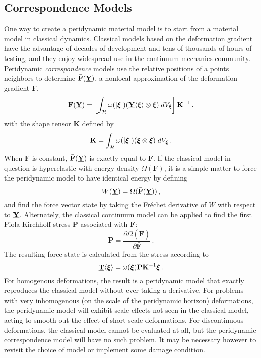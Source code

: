 \subsection{Correspondence Models}
One way to create a peridynamic material model is to start from a material model in classical dynamics.
Classical models based on the deformation gradient have the advantage of decades of development and tens of thousands of hours of testing, and they enjoy widespread use in the continuum mechanics community.
Peridynamic \textit{correspondence} models use the relative positions of a points neighbors to determine $\bar{\mathbf{F}}(\vstate{Y}{}{})$, a nonlocal approximation of the deformation gradient $\mathbf{F}$.
%
\begin{equation}
\label{eq:PDapproxGradient}
\bar{\mathbf{F}}(\vstate{Y}{}{}) = \left[\int_\mathcal{H} \omega(|\boldsymbol{\xi}|)(\vstate{Y}{}{\boldsymbol{\xi}}\otimes \boldsymbol{\xi})\;dV_{\boldsymbol{\xi}} \right]\mathbf{K}^{-1}\, ,
\end{equation}
with the shape tensor $\mathbf{K}$ defined by
\begin{equation}
\mathbf{K} = \int_\mathcal{H}\omega(|\boldsymbol{\xi}|)(\boldsymbol{\xi} \otimes \boldsymbol{\xi})\;dV_{\boldsymbol{\xi}}\, . \notag
\end{equation}
%
When $\mathbf{F}$ is constant, $\bar{\mathbf{F}}(\vstate{Y}{}{})$ is exactly equal to $\mathbf{F}$.
If the classical model in question is hyperelastic with energy density $\Omega(\mathbf{F})$, it is a simple matter to force the peridynamic model to have identical energy by defining
\begin{equation}
W(\vstate{Y}{}{}) = \Omega(\bar{\mathbf{F}}(\vstate{Y}{}{}))\, ,
\end{equation}
and find the force vector state by taking the Fr\'echet derivative of $W$ with respect to $\vstate{Y}{}{}$.
Alternately, the classical continuum model can be applied to find the first Piola-Kirchhoff stress $\mathbf{P}$ associated with $\bar{\mathbf{F}}$:
\begin{equation}
\mathbf{P}=\frac{\partial\Omega(\bar{\mathbf{F}})}{\partial\bar{\mathbf{F}}}\, .
\end{equation}
The resulting force state is calculated from the stress according to
\begin{equation}
\vstate{T}{}{\boldsymbol{\xi}} = \omega(\boldsymbol{\xi})\mathbf{P}\mathbf{K}^{-1}\boldsymbol{\xi}\, .
\end{equation}
For homogenous deformations, the result is a peridynamic model that exactly reproduces the classical model without ever taking a derivative.
For problems with very inhomogenous (on the scale of the peridynamic horizon) deformations, the peridynamic model will exhibit scale effects not seen in the classical model, acting to smooth out the effect of short-scale deformations.
For discontinuous deformations, the classical model cannot be evaluated at all, but the peridynamic correspondence model will have no such problem.
It may be necessary however to revisit the choice of model or implement some damage condition. 

